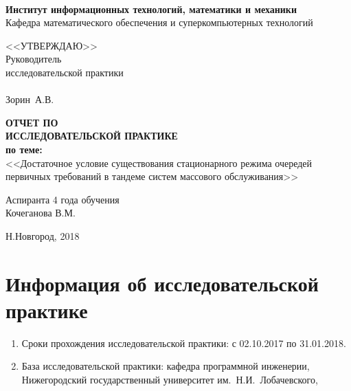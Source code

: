 \documentclass[12pt]{extarticle}
\theoremstyle{theorem}
\theoremstyle{remark}
\begin{document}
\begin{titlepage}

  \begin{center}
  \\

 \medskip

 
   \textbf{ Институт информационных технологий, математики и механики }\\
    Кафедра математического обеспечения и суперкомпьютерных технологий

    
 \medskip
  \medskip
   \medskip \medskip
    \medskip
     \medskip
      \medskip
     \hfill
    \begin{minipage}[h]{ 0.31\linewidth}
    <<УТВЕРЖДАЮ>>\\
    Руководитель \\
    исследовательской практики\\
\\
    \underline{\hspace{3cm}} Зорин~А.В.
    \end{minipage}
   \medskip \medskip
    \medskip
     \medskip
      \medskip
   \medskip \medskip
    \medskip
     \medskip
      \medskip
      
    \textbf{ОТЧЕТ  ПО}\\ \textbf{ИССЛЕДОВАТЕЛЬСКОЙ ПРАКТИКЕ}\\
 \medskip
    \textbf{по теме:} \\
    <<Достаточное условие существования стационарного режима очередей \\ первичных требований в тандеме систем массового обслуживания>>
    
         \medskip
      \medskip
               \medskip
      \medskip
    \hfill
    \begin{minipage}[h]{ 0.5\linewidth}
    Аспиранта 4 года обучения\\
    Кочеганова В.М.
    \end{minipage}
    \vfill {Н.Новгород, 2018}
  \end{center}
\end{titlepage}


\tableofcontents
\newpage

\section{Информация об исследовательской практике}
\begin{enumerate}
    \item Сроки прохождения исследовательской практики: с 02.10.2017 по 31.01.2018.
    \item База исследовательской практики: кафедра программной инженерии, \newline Нижегородский государственный университет им.~Н.И.~Лобачевского, 
\end{enumerate}
\newpage
\end{document}
